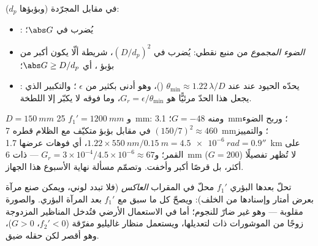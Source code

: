 \begin{proposition}\label{prop:b1:optical-instruments:gains}
في مقابل  المجرّدة (وبؤبؤها $d_p$):
\begin{itemize}
  \item \emph{}: يُضرب في $\abs G$؛
  \item \emph{الضوء المجموع} من منبع نقطي: يُضرب في
        $(D/d_p)^2$، شريطة ألّا يكون  أكبر من
        بؤبؤ ، أي $\abs G \geq D/d_p$؛
  \item \emph{}: يحدّه الحيود عند 
        عند $\theta_{\min} \approx 1.22\,\lambda/D$ ()، وهو أدنى بكثير من $\epsilon$ ؛ والتكبير
        الذي يجعل هذا الحدّ مرئيًّا هو $G_r = \epsilon/\theta_{\min}$،
        وما فوقه لا يكبّر إلا اللطخة.
\end{itemize}
\end{proposition}
\admitted

\begin{example}\label{ex:b1:optical-instruments:telnum}
$D = \qty{150}{mm}$ و $f_1' = \qty{1200}{mm}$  \qty{25}{mm}:
ومنه $G = -48$؛  \qty{3.1}{mm}؛ وربح الضوء $(150/7)^2 \approx
460$ في مقابل بؤبؤ متكيّف مع الظلام قطره \qty{7}{mm}؛ والتمييز $1.22 \times
\qty{550}{nm}/\qty{0.15}{m} = \qty{4.5e-6}{rad} = 0.9''$، أي
فوهات عرضها \qty{1.7}{km} على القمر؛ و$G_r = 3\times10^{-4}/4.5\times
10^{-6} \approx 67$ ---  ذات \qty{6}{mm} ($G = 200$) لا تُظهر
تفصيلًا أكثر، بل قرصًا أكبر وأخفت. وتصمّم مسألة نهاية الأسبوع
هذا الجهاز.
\end{example}

\begin{remark}\label{rem:b1:optical-instruments:variants}
تحلّ  بعدها البؤري $f_1'$ محلّ   في
المقراب \emph{العاكس} (فلا تبدد لوني، ويمكن صنع مرآة بعرض أمتار
وإسنادها من الخلف): ويصحّ كل ما سبق مع $f_1'$ بعد المرآة البؤري.
والصورة مقلوبة ---
وهو غير ضارّ للنجوم؛ أما في الاستعمال الأرضي فتُدخل المناظير المزدوجة
زوجًا من الموشورات ذات  لتعديلها، ويستعمل منظار غاليليو
 مفرّقة ($f_2' < 0$، $G > 0$)، وهو أقصر لكن حقله ضيق.
\end{remark}

